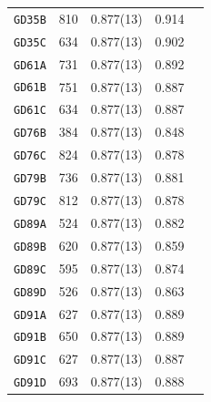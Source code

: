 \begin{table}
\begin{center}
\begin{tabular}{lcccc}
		\texttt{GD35B}	&	810 	&	0.877(13)	&	0.914   	&		\\
		\texttt{GD35C}	&	634 	&	0.877(13)	&	0.902   	&		\\
		\texttt{GD61A}	&	731 	&	0.877(13)	&	0.892   	&		\\
		\texttt{GD61B}	&	751 	&	0.877(13)	&	0.887   	&		\\
		\texttt{GD61C}	&	634 	&	0.877(13)	&	0.887   	&		\\
		\texttt{GD76B}	&	384 	&	0.877(13)	&	0.848   	&		\\
		\texttt{GD76C}	&	824 	&	0.877(13)	&	0.878   	&		\\
		\texttt{GD79B}	&	736 	&	0.877(13)	&	0.881   	&		\\
		\texttt{GD79C}	&	812 	&	0.877(13)	&	0.878   	&		\\
		\texttt{GD89A}	&	524 	&	0.877(13)	&	0.882   	&		\\
		\texttt{GD89B}	&	620 	&	0.877(13)	&	0.859   	&		\\
		\texttt{GD89C}	&	595 	&	0.877(13)	&	0.874   	&		\\
		\texttt{GD89D}	&	526 	&	0.877(13)	&	0.863   	&		\\
		\texttt{GD91A}	&	627 	&	0.877(13)	&	0.889   	&		\\
		\texttt{GD91B}	&	650 	&	0.877(13)	&	0.889   	&		\\
		\texttt{GD91C}	&	627 	&	0.877(13)	&	0.887   	&		\\
		\texttt{GD91D}	&	693 	&	0.877(13)	&	0.888   	&		\\
		\bottomrule
	\end{tabular}
	\end{center}
\end{table}
